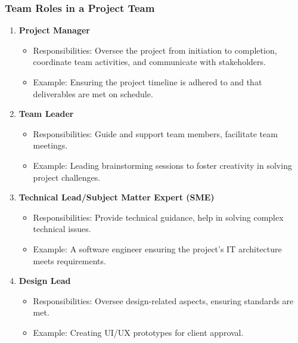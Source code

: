 \documentclass{beamer}
\begin{document}
\begin{frame}[fragile]
    \frametitle{Team Roles in a Project Team}
    \begin{enumerate}
        \item \textbf{Project Manager}
        \begin{itemize}
            \item Responsibilities: Oversee the project from initiation to completion, coordinate team activities, and communicate with stakeholders.
            \item Example: Ensuring the project timeline is adhered to and that deliverables are met on schedule.
        \end{itemize}
        
        \item \textbf{Team Leader}
        \begin{itemize}
            \item Responsibilities: Guide and support team members, facilitate team meetings.
            \item Example: Leading brainstorming sessions to foster creativity in solving project challenges.
        \end{itemize}
        
        \item \textbf{Technical Lead/Subject Matter Expert (SME)}
        \begin{itemize}
            \item Responsibilities: Provide technical guidance, help in solving complex technical issues.
            \item Example: A software engineer ensuring the project’s IT architecture meets requirements.
        \end{itemize}
        
        \item \textbf{Design Lead}
        \begin{itemize}
            \item Responsibilities: Oversee design-related aspects, ensuring standards are met.
            \item Example: Creating UI/UX prototypes for client approval.
        \end{itemize}
    \end{enumerate}
\end{frame}
\end{document}
